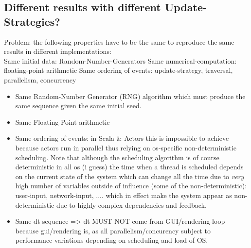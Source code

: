 \subsection{Different results with different Update-Strategies?}
Problem: the following properties have to be the same to reproduce the same results in different implementations: \\

Same initial data: Random-Number-Generators
Same numerical-computation: floating-point arithmetic
Same ordering of events: update-strategy, traversal, parallelism, concurrency

\begin{itemize}
\item Same Random-Number Generator (RNG) algorithm which must produce the same sequence given the same initial seed.
\item Same Floating-Point arithmetic
\item Same ordering of events: in Scala \& Actors this is impossible to achieve because actors run in parallel thus relying on os-specific non-deterministic scheduling. Note that although the scheduling algorithm is of course deterministic in all os (i guess) the time when a thread is scheduled depends on the current state of the system which can change all the time due to \textit{very} high number of variables outside of influence (some of the non-deterministic): user-input, network-input, .... which in effect make the system appear as non-deterministic due to highly complex dependencies and feedback.
\item Same dt sequence => dt MUST NOT come from GUI/rendering-loop because gui/rendering is, as all parallelism/concurency subject to performance variations depending on scheduling and load of OS.
\end{itemize}

